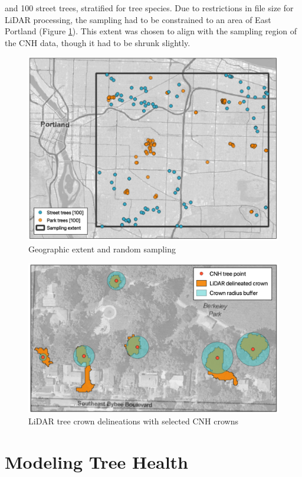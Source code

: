 \documentclass[12pt,twoside]{reedthesis}
\begin{document}
and 100 street trees, stratified for tree species. Due to restrictions
in file size for LiDAR processing, the sampling had to be constrained to
an area of East Portland (Figure \ref{fig:clip-extent}). This extent
was chosen to align with the sampling region of the CNH data, though it
had to be shrunk slightly.
\begin{figure}

{\centering \includegraphics[width=0.8\linewidth]{figure/extent_and_samples} 

}

\caption{Geographic extent and random sampling}\label{fig:clip-extent}
\end{figure}
\begin{figure}

{\centering \includegraphics[width=0.8\linewidth]{figure/layered_outputs} 

}

\caption{LiDAR tree crown delineations with selected CNH crowns}\label{fig:unnamed-chunk-6}
\end{figure}
\hypertarget{modeling-tree-health}{%
\section{Modeling Tree Health}\label{modeling-tree-health}}
\end{document}
